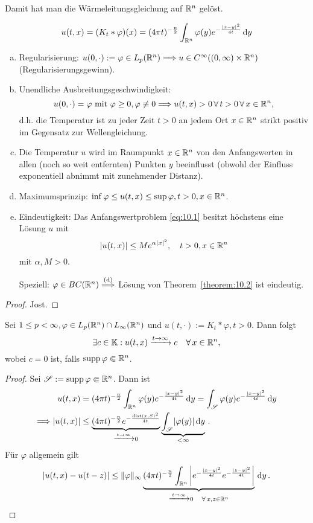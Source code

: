 Damit hat man die Wärmeleitungsgleichung auf $\mathbb{R}^n$ gelöst.

\begin{bem}
\label{bem:10.3}
\[
	u(t,x) = (K_t \ast \varphi)(x) = (4\pi t)^{-\frac n2} \int_{\mathbb{R}^n} \varphi(y) e^{-\frac{\lvert x-y\rvert^2}{4t}} \,\mathrm{d} y
\]
\begin{enumerate}[(a)]
\item Regularisierung: $u(0,\cdot) := \varphi \in L_p(\mathbb{R}^n) \Longrightarrow u \in C^\infty ((0,\infty)\times \mathbb{R}^n)$ (Regularisierungsgewinn).
\item Unendliche Ausbreitungsgeschwindigkeit:
\[
	u(0,\cdot) = \varphi \text{ mit }\varphi \geq 0, \varphi\not\equiv 0 \Longrightarrow u(t,x) >0 \, \forall \, t> 0\, \forall \, x \in \mathbb{R}^n,
\]
d.h. die Temperatur ist zu jeder Zeit $t>0$ an jedem Ort $x \in\mathbb{R}^n$ strikt positiv im Gegensatz zur Wellengleichung.
\item Die Temperatur $u$ wird im Raumpunkt $x \in \mathbb{R}^n$ von den Anfangswerten in allen (noch so weit entfernten) Punkten $y$ beeinflusst (obwohl der Einfluss exponentiell abnimmt mit zunehmender Distanz).
\item Maximumsprinzip: $\inf \varphi \leq u(t,x) \leq \sup \varphi, t > 0, x \in \mathbb{R}^n$.
\item Eindeutigkeit: Das Anfangswertproblem \eqref{eq:10.1} besitzt höchstens eine Lösung $u$ mit
\[
	\lvert u(t,x)\rvert \leq  M e^{\alpha\lvert x\rvert^2} , \quad t > 0, x \in \mathbb{R}^n
\]
mit $\alpha, M > 0$.

Speziell: $\varphi \in BC(\mathbb{R}^n) \stackrel{\scriptsize\text{(d)}}{\Longrightarrow}$ Lösung von Theorem~\ref{theorem:10.2} ist eindeutig.
\end{enumerate}
\begin{proof}
Jost.
\end{proof}
\end{bem}

\begin{satz}
\label{satz:10.4}
Sei $1\leq p < \infty, \varphi \in L_p(\mathbb{R}^n)\cap L_\infty (\mathbb{R}^n)$ und $u(t,\cdot) := K_t \ast \varphi, t >0$. Dann folgt
\[
	\exists c \in \mathbb{K} : u(t,x) \xrightarrow{t\rightarrow \infty} c \quad \forall \, x \in \mathbb{R}^n ,
\]
wobei $c = 0$ ist, falls $\operatorname{supp} \varphi \Subset \mathbb{R}^n$.
\end{satz}

\begin{proof}
Sei $\mathscr S := \operatorname{supp} \varphi \Subset \mathbb{R}^n$. Dann ist
\begin{align*}
u(t,x) & = (4\pi t)^{-\frac n2} \int_{\mathbb{R}^n} \varphi (y) e^{-\frac{\lvert x-y\rvert^2}{4t}} \,\mathrm{d} y  = \int_{\mathscr S} \varphi (y) e^{-\frac{\lvert x-y\rvert^2}{4t}} \,\mathrm{d} y  \\
\Longrightarrow \lvert u(t,x)\rvert & \leq \underbrace{(4\pi t)^{-\frac n2} e^{-\frac{\operatorname{dist} (x,S)^2}{4t}}}_{\xrightarrow{t\rightarrow\infty} 0} \underbrace{\int_{\mathscr S} \lvert \varphi (y)\rvert \,\mathrm{d} y}_{< \infty} \, .
\end{align*}
Für $\varphi$ allgemein gilt
\[
	\lvert u(t,x)-u(t-z)\rvert \leq \lVert \varphi\rVert_\infty \underbrace{(4\pi t)^{-\frac n2} \int_{\mathbb{R}^n} \left\lvert e^{-\frac{\lvert x-y\rvert^2}{4t}} e^{-\frac{\lvert z-y\rvert^2}{4t}} \right\rvert}_{\xrightarrow{t\rightarrow \infty} 0 \quad \forall \, x,z \in \mathbb{R}^n} \,\mathrm{d} y \, .
\]
\end{proof}

